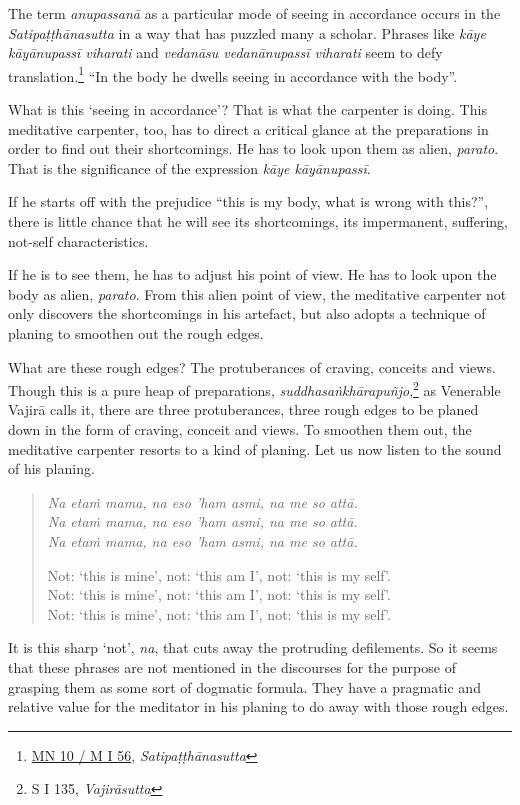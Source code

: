 The term \emph{anupassanā} as a particular mode of seeing in accordance occurs in the \emph{Satipaṭṭhānasutta} in a way that has puzzled many a scholar. Phrases like \emph{kāye kāyānupassī viharati} and \emph{vedanāsu vedanānupassī viharati} seem to defy translation.\footnote{\href{https://suttacentral.net/mn10/pli/ms}{MN 10 / M I 56}, \emph{Satipaṭṭhānasutta}} ``In the body he dwells seeing in accordance with the body''.

What is this `seeing in accordance'? That is what the carpenter is doing. This meditative carpenter, too, has to direct a critical glance at the preparations in order to find out their shortcomings. He has to look upon them as alien, \emph{parato}. That is the significance of the expression \emph{kāye kāyānupassī}.

If he starts off with the prejudice ``this is my body, what is wrong with this?'', there is little chance that he will see its shortcomings, its impermanent, suffering, not-self characteristics.

If he is to see them, he has to adjust his point of view. He has to look upon the body as alien, \emph{parato}. From this alien point of view, the meditative carpenter not only discovers the shortcomings in his artefact, but also adopts a technique of planing to smoothen out the rough edges.

What are these rough edges? The protuberances of craving, conceits and views. Though this is a pure heap of preparations, \emph{suddhasaṅkhārapuñjo},\footnote{S I 135, \emph{Vajirāsutta}} as Venerable Vajirā calls it, there are three protuberances, three rough edges to be planed down in the form of craving, conceit and views. To smoothen them out, the meditative carpenter resorts to a kind of planing. Let us now listen to the sound of his planing.

\begin{quote}
\emph{Na etaṁ mama, na eso 'ham asmi, na me so attā.}\\
\emph{Na etaṁ mama, na eso 'ham asmi, na me so attā.}\\
\emph{Na etaṁ mama, na eso 'ham asmi, na me so attā.}

Not: `this is mine', not: `this am I', not: `this is my self'.\\
Not: `this is mine', not: `this am I', not: `this is my self'.\\
Not: `this is mine', not: `this am I', not: `this is my self'.
\end{quote}

It is this sharp `not', \emph{na}, that cuts away the protruding defilements. So it seems that these phrases are not mentioned in the discourses for the purpose of grasping them as some sort of dogmatic formula. They have a pragmatic and relative value for the meditator in his planing to do away with those rough edges.

